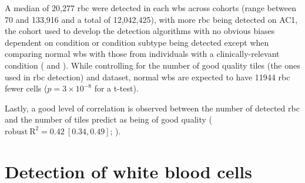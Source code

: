 \begin{figure}[!ht]
    \label{fig:rbc-filter-examples}
\end{figure}

A median of 20,277 \ac{rbc} were detected in each \ac{wbs} across cohorts (range between 70 and 133,916 and a total of 12,042,425), with more \ac{rbc} being detected on AC1, the cohort used to develop the detection algorithms with no obvious biases dependent on condition or condition subtype being detected except when comparing normal \ac{wbs} with those from individuals with a clinically-relevant condition ( and ). While controlling for the number of good quality tiles (the ones used in \ac{rbc} detection) and dataset, normal \ac{wbs} are expected to have 11944 \ac{rbc} fewer cells ($p=3 \times 10^{-8}$ for a t-test). 

\begin{figure}[!ht]
    \label{fig:rbc-count-coarse}
\end{figure}

\begin{figure}[!ht]
    \label{fig:rbc-count-fine}
\end{figure}

Lastly, a good level of correlation is observed between the number of detected \ac{rbc} and the number of tiles predict as being of good quality ($\mathrm{robust\ R}^2=0.42\ [0.34,0.49]$; ).

\begin{figure}[!ht]
    \label{fig:rbc-quality-tiles}
\end{figure}

\section{Detection of white blood cells}

